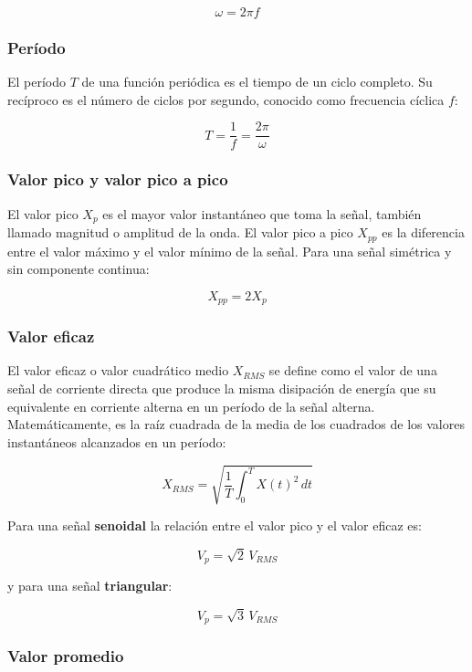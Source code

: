 \documentclass{article}
\begin{document}
    \[
        \omega = 2\pi f
    \]

    \subsubsection{Período}

    El período $T$ de una función periódica es el tiempo de un ciclo completo. Su recíproco es el número de ciclos por segundo, conocido como frecuencia cíclica $f$:

    \[
        T = \frac{1}{f} = \frac{2\pi}{\omega}
    \]

    \subsubsection{Valor pico y valor pico a pico}

    El valor pico $X_p$ es el mayor valor instantáneo que toma la señal, también llamado magnitud o amplitud de la onda. El valor pico a pico $X_{pp}$ es la diferencia entre el valor máximo y el valor mínimo de la señal. Para una señal simétrica y sin componente continua:

    \[
        X_{pp} = 2X_p
    \]

    \subsubsection{Valor eficaz}

    El valor eficaz o valor cuadrático medio $X_{RMS}$ se define como el valor de una señal de corriente directa que produce la misma disipación de energía que su equivalente en corriente alterna en un período de la señal alterna. Matemáticamente, es la raíz cuadrada de la media de los cuadrados de los valores instantáneos alcanzados en un período:

    \begin{equation}
        X_{RMS} = \sqrt{\frac{1}{T}\int_{0}^{T} X(t)^2\,dt}\label{eq:rms}
    \end{equation}

    Para una señal \textbf{senoidal} la relación entre el valor pico y el valor eficaz es:

    \[
        V_p = \sqrt{2}\,V_{RMS}
    \]

    y para una señal \textbf{triangular}:

    \[
        V_p = \sqrt{3}\,V_{RMS}
    \]

    \subsubsection{Valor promedio}
\end{document}
